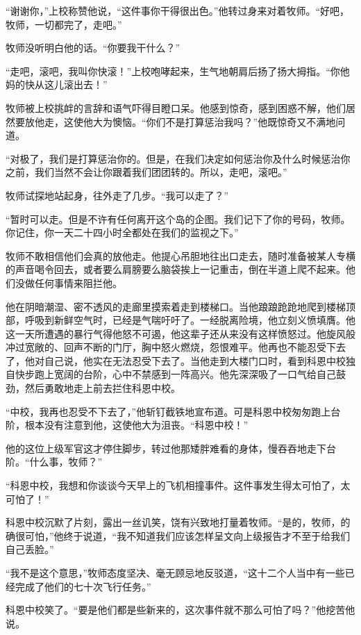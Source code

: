     “谢谢你，”上校称赞他说，“这件事你干得很出色。”他转过身来对着牧师。“好吧，牧师，一切都完了，走吧。”

    牧师没听明白他的话。“你要我干什么？”

    “走吧，滚吧，我叫你快滚！”上校咆哮起来，生气地朝肩后扬了扬大拇指。“你他妈的快从这儿滚出去！”

    牧师被上校挑衅的言辞和语气吓得目瞪口呆。他感到惊奇，感到困惑不解，他们居然要放他走，这使他大为懊恼。“你们不是打算惩治我吗？”他既惊奇又不满地问道。

    “对极了，我们是打算惩治你的。但是，在我们决定如何惩治你及什么时候惩治你之前，我们当然不会让你跟着我们团团转的。所以，走吧，滚吧。”

    牧师试探地站起身，往外走了几步。“我可以走了？”

    “暂时可以走。但是不许有任何离开这个岛的企图。我们记下了你的号码，牧师。你记住，你一天二十四小时全都处在我们的监视之下。”

    牧师不敢相信他们会真的放他走。他提心吊胆地往出口走去，随时准备被某人专横的声音喝令回去，或者要么肩膀要么脑袋挨上一记重击，倒在半道上爬不起来。他们没做任何事情来阻拦他。
 


    他在阴暗潮湿、密不透风的走廊里摸索着走到楼梯口。当他踉踉跄跄地爬到楼梯顶部，呼吸到新鲜空气时，已经是气喘吁吁了。一经脱离险境，他立刻义愤填膺。他这一天所遭遇的暴行气得他怒不可遏，他这辈子还从来没有这样愤怒过。他旋风般冲过宽敞的、回声不断的门厅，胸中怒火燃烧，怨恨难平。他再也不能忍受下去了，他对自己说，他实在无法忍受下去了。当他走到大楼门口时，看到科恩中校独自快步跑上宽阔的台阶，心中不禁感到一阵高兴。他先深深吸了一口气给自己鼓劲，然后勇敢地走上前去拦住科恩中校。

    “中校，我再也忍受不下去了，”他斩钉截铁地宣布道。可是科恩中校匆匆跑上台阶，根本没有注意到他，这使他大为沮丧。“科恩中校！”

    他的这位上级军官这才停住脚步，转过他那矮胖难看的身体，慢吞吞地走下台阶。“什么事，牧师？”

    “科恩中校，我想和你谈谈今天早上的飞机相撞事件。这件事发生得太可怕了，太可怕了！”

    科恩中校沉默了片刻，露出一丝讥笑，饶有兴致地打量着牧师。“是的，牧师，的确很可怕，”他终于说道，“我不知道我们应该怎样呈文向上级报告才不至于给我们自己丢脸。”

    “我不是这个意思，”牧师态度坚决、毫无顾忌地反驳道，“这十二个人当中有一些已经完成了他们的七十次飞行任务。”

    科恩中校笑了。“要是他们都是些新来的，这次事件就不那么可怕了吗？”他挖苦他说。

